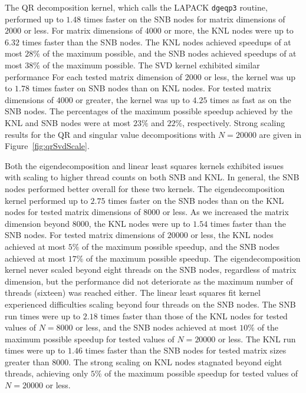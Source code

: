 The QR decomposition kernel, which calls the LAPACK \texttt{dgeqp3} routine, performed up
to $1.48$ times faster on the SNB nodes for matrix dimensions of $2000$ or less. For
matrix dimensions of $4000$ or more, the KNL nodes were up to $6.32$ times faster than the
SNB nodes. The KNL nodes achieved speedups of at most $28\%$ of the maximum possible, and
the SNB nodes achieved speedups of at most $38\%$ of the maximum possible. The SVD kernel
exhibited similar performance For each tested matrix dimension of $2000$ or less, the
kernel was up to $1.78$ times faster on SNB nodes than on KNL nodes. For tested matrix
dimensions of $4000$ or greater, the kernel was up to $4.25$ times as fast as on the SNB
nodes. The percentages of the maximum possible speedup achieved by the KNL and SNB nodes
were at most $23\%$ and $22\%$, respectively. Strong scaling results for the QR and
singular value decompositions with $N=20000$ are given in Figure~\ref{fig:qrSvdScale}.


Both the eigendecomposition and linear least squares kernels exhibited issues with scaling
to higher thread counts on both SNB and KNL. In general, the SNB nodes performed better
overall for these two kernels. The eigendecomposition kernel performed up to $2.75$ times
faster on the SNB nodes than on the KNL nodes for tested matrix dimensions of $8000$ or
less. As we increased the matrix dimension beyond $8000$, the KNL nodes were up to $1.54$
times faster than the SNB nodes. For tested matrix dimensions of $20000$ or less, the KNL
nodes achieved at most $5\%$ of the maximum possible speedup, and the SNB nodes achieved
at most $17\%$ of the maximum possible speedup. The eigendecomposition kernel never scaled
beyond eight threads on the SNB nodes, regardless of matrix dimension, but the performance
did not deteriorate as the maximum number of threads (sixteen) was reached either. The
linear least squares fit kernel experienced difficulties scaling beyond four threads on
the SNB nodes. The SNB run times were up to $2.18$ times faster than those of the KNL
nodes for tested values of $N=8000$ or less, and the SNB nodes achieved at most $10\%$ of
the maximum possible speedup for tested values of $N=20000$ or less. The KNL run times
were up to $1.46$ times faster than the SNB nodes for tested matrix sizes greater than
$8000$. The strong scaling on KNL nodes stagnated beyond eight threads, achieving only
$5\%$ of the maximum possible speedup for tested values of $N=20000$ or less.

